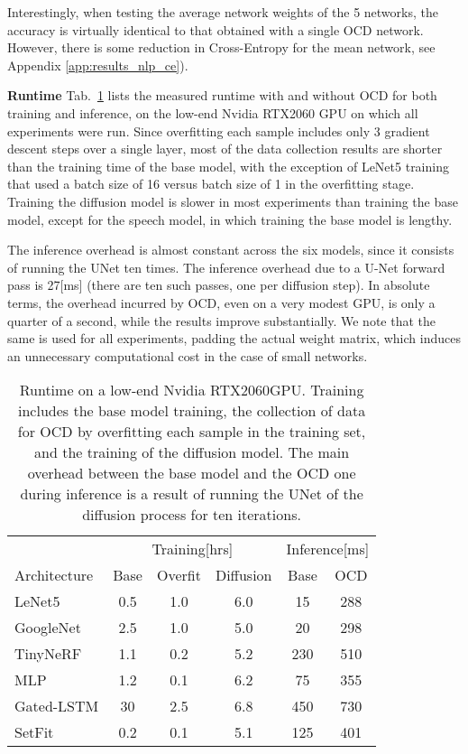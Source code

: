 \documentclass{article}
\theoremstyle{plain}
\begin{document}
Interestingly, when testing the average network weights of the 5 networks, the accuracy is virtually identical to that obtained with a single OCD network. However, there is some reduction in Cross-Entropy for the mean network, see Appendix \ref{app:results_nlp_ce}).



{\bf Runtime\quad}
Tab.~\ref{tab:running_time} lists the measured runtime with and without OCD for both training and inference, on the low-end Nvidia RTX2060 GPU on which all experiments were run. Since overfitting each sample includes only 3 gradient descent steps over a single layer, most of the data collection results are shorter than the training time of the base model, with the exception of LeNet5 training that used a batch size of 16 versus batch size of 1 in the overfitting stage. Training the diffusion model is slower in most experiments than training the base model, except for the speech model, in which training the base model is lengthy. 

The inference overhead is almost constant across the six models, since it consists of running the UNet  ten times. The inference overhead due to a U-Net forward pass is 27[ms]  (there are ten such passes, one per diffusion step). In absolute terms,  the overhead incurred by OCD, even on a very modest GPU, is only a quarter of a second, while the results improve substantially. We note that the same  is used for all experiments, padding the actual weight matrix, which induces an unnecessary computational cost in the case of small networks.



\begin{table}[t]
    \caption{Runtime on a low-end Nvidia RTX2060GPU. Training includes the base model training, the collection of data for OCD by overfitting each sample in the training set, and the training of the diffusion model. The main overhead between the base model and the OCD one during inference is a result of running the UNet of the diffusion process for ten iterations.}
    \label{tab:running_time}
    \smallskip
    \centering
    \begin{tabular}{@{}l@{~}c@{~}c@{~}c@{~~}c@{~}c@{}}
    \toprule
    & \multicolumn{3}{c}{Training[hrs]}& \multicolumn{2}{c}{Inference[ms]}\\
    \cmidrule(lr){2-4}
    \cmidrule(lr){5-6}
         Architecture& Base & Overfit & Diffusion&Base & OCD\\
    \midrule
         LeNet5&0.5&1.0&6.0&15&288 \\
         GoogleNet&2.5&1.0&5.0&20&298 \\
         TinyNeRF&1.1&0.2&5.2&230&510 \\
         MLP&1.2&0.1&6.2&75&355 \\
         Gated-LSTM&30&2.5&6.8&450&730\\
         SetFit&0.2&0.1&5.1&125&401 \\
    \bottomrule
    \end{tabular}
\end{table}
\end{document}
